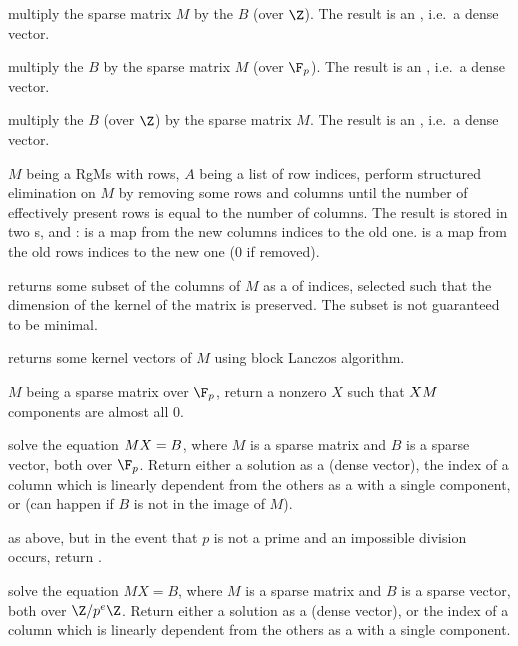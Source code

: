  multiply the sparse matrix $M$
by the  $B$ (over $\Z$). The result is an , i.e.~a
dense vector.

 multiply the  $B$
by the sparse matrix $M$ (over $\F_p$). The result is an , i.e.~a
dense vector.

 multiply the   $B$ (over
$\Z$) by the sparse matrix $M$. The result is an , i.e.~a
dense vector.

$M$ being a RgMs with  rows, $A$ being a list of row indices,
perform structured elimination on $M$ by removing some rows and columns until
the number of effectively present rows is equal to the number of columns.
The result is stored in two s,  and :
 is a map from the new columns indices to the old one.
 is a map from the old rows indices to the new one ($0$ if removed).

 returns some subset of the columns
of $M$ as a  of indices, selected such that the dimension of the
kernel of the matrix is preserved. The subset is not guaranteed to be minimal.

 returns some kernel vectors of $M$
using block Lanczos algorithm.

$M$ being a sparse matrix over $\F_p$, return a nonzero  $X$ such
that $X\*M$ components are almost all $0$.

solve the equation $M\*X = B$, where $M$ is a sparse matrix and $B$ is a sparse
vector, both over $\F_p$. Return either a solution as a  (dense
vector), the index of a column which is linearly dependent from the
others as a  with a single component, or 
(can happen if $B$ is not in the image of $M$).

as above, but in the event that $p$ is not a prime and an impossible division
occurs, return .

solve the equation $MX = B$, where $M$ is a sparse matrix and $B$ is a sparse
vector, both over $\Z/p^e\Z$. Return either a solution as a  (dense
vector), or the index of a column which is linearly dependent from the
others as a  with a single component.

